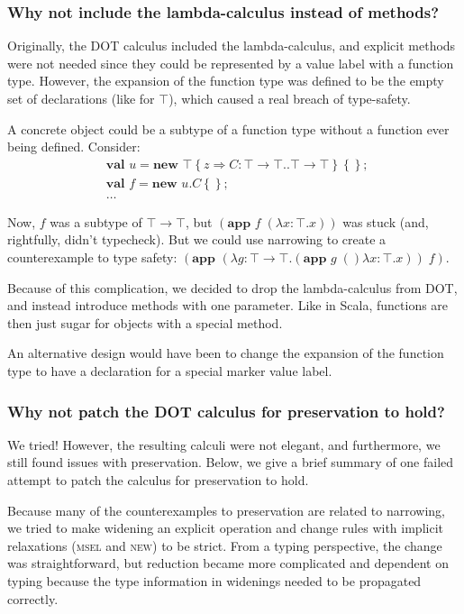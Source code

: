 \documentclass[9pt]{sigplanconf}
\newcommand{\tfun}{\rightarrow}
\newcommand{\refine}[2]{\left\{#1 \Rightarrow #2 \right\}}
\newcommand{\ldefs}[1]{\left\{#1\right\}}
\newcommand{\abs}[3]{\lambda #1\!:\!#2.#3}
\newcommand{\mlnew}[3]{\textbf{val }#1 = \textbf{new }#2 ;\;\\&#3}
\newcommand{\Ldecl}[3]{#1 : #2..#3}%
\newcommand{\Top}{\top}%
\newcommand{\app}[2]{(\textbf{app }#1\;#2)}
\begin{document}
\subsubsection{Why not include the lambda-calculus instead of methods?}

Originally, the DOT calculus included the lambda-calculus, and
explicit methods were not needed since they could be represented by a
value label with a function type. However, the expansion of the
function type was defined to be the empty set of declarations (like
for $\Top$), which caused a real breach of type-safety.

A concrete object could be a subtype of a function type without a
function ever being defined. Consider:
\begin{align*}
&\mlnew u {\Top \refine z {\Ldecl C {\Top \tfun \Top} {\Top \tfun \Top}} \ldefs{}} {
\mlnew f {u.C \ldefs{}} {
\ldots
}}
\end{align*}

Now, $f$ was a subtype of $\Top \tfun \Top$, but $\app f {(\abs x \Top
  x)}$ was stuck (and, rightfully, didn't typecheck). But we could use
narrowing to create a counterexample to type safety: $\app {(\abs g
  {\Top \tfun \Top} {\app g (\abs x \Top x)})} f$.

Because of this complication, we decided to drop the lambda-calculus
from DOT, and instead introduce methods with one parameter. Like in
Scala, functions are then just sugar for objects with a special
method.

An alternative design would have been to change the expansion of the
function type to have a declaration for a special marker value label.

\subsubsection{Why not patch the DOT calculus for preservation to hold?}

We tried! However, the resulting calculi were not elegant, and
furthermore, we still found issues with preservation. Below, we give a
brief summary of one failed attempt to patch the calculus for
preservation to hold.

Because many of the counterexamples to preservation are related to
narrowing, we tried to make widening an explicit operation and change
rules with implicit relaxations (\textsc{msel} and \textsc{new}) to be
strict. From a typing perspective, the change was straightforward, but
reduction became more complicated and dependent on typing because the
type information in widenings needed to be propagated correctly.
\end{document}
